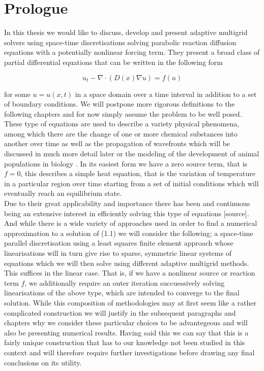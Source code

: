 \documentclass[../draft_1.tex]{subfiles}
\begin{document}
\chapter{Prologue}

In this thesis we would like to discuss, develop and present adaptive multigrid solvers using space-time discretisations solving parabolic reaction diffusion equations with a potentially nonlinear forcing term. They present a broad class of partial differential equations that can be written in the following form
\begin{ceqn}
\begin{equation}
u_t - \nabla \cdot ( D(x) \nabla u) = f(u)
\end{equation}
\end{ceqn}
for some $u = u(x,t)$ in a space domain over a time interval in addition to a set of boundary conditions. We will postpone more rigorous definitions to the following chapters and for now simply assume the problem to be well posed. These type of equations are used to describe a variety physical phenomena, among which there are the change of one or more chemical substances into another over time as well as the propagation of wavefronts which will be discussed in much more detail later \cite{zegeling2004adaptive} or the modeling of the development of animal populations in biology \cite{cosner2008reaction}. In its easiest form we have a zero source term, that is $f = 0$, this describes a simple heat equation, that is the variation of temperature in a particular region over time starting from a set of initial conditions which will eventually reach an equilibrium state.
\smallskip
\\
Due to their great applicability and importance there has been and continuous being an extensive interest in efficiently solving this type of equations [source]. And while there is a wide variety of approaches used in order to find a numerical approximation to a solution of (1.1) we will consider the following; a space-time parallel discretisation using a least squares finite element approach whose linearisations will in turn give rise to sparse, symmetric linear systems of equations which we will then solve using different adaptive multigrid methods. This suffices in the linear case. That is, if we have a nonlinear source or reaction term $f$, we additionally require an outer iteration succuessively solving linearisations of the above type, which are intended to converge to the final solution. While this composition of methodologies may at first seem like a rather complicated construction we will justify in the subsequent paragraphs and chapters why we consider these particular choices to be advantegeous and will also be presenting numerical results. Having said this we can say that this is a fairly unique construction that has to our knowledge not been studied in this context and will therefore require further investigations before drawing any final conclusions on its utility.
\end{document}
